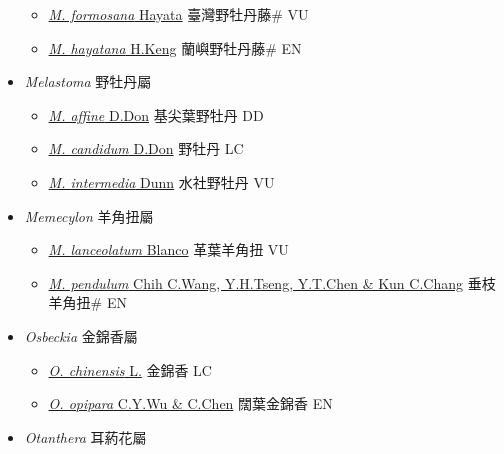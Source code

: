 \begin{itemize}
  \begin{itemize}
        \item[] \href{http://www.theplantlist.org/tpl1.1/search?q=Medinilla+formosana}{\textit{M. formosana} Hayata}   臺灣野牡丹藤\# VU
        \item[] \href{http://www.theplantlist.org/tpl1.1/search?q=Medinilla+hayatana}{\textit{M. hayatana} H.Keng}   蘭嶼野牡丹藤\# EN
  \end{itemize}
 \item[] \textit{Melastoma} 野牡丹屬
                    
  \begin{itemize}
        \item[] \href{http://www.theplantlist.org/tpl1.1/search?q=Melastoma+affine}{\textit{M. affine} D.Don}   基尖葉野牡丹 DD
        \item[] \href{http://www.theplantlist.org/tpl1.1/search?q=Melastoma+candidum}{\textit{M. candidum} D.Don}   野牡丹 LC
        \item[] \href{http://www.theplantlist.org/tpl1.1/search?q=Melastoma+intermedia}{\textit{M. intermedia} Dunn}   水社野牡丹 VU
  \end{itemize}
 \item[] \textit{Memecylon} 羊角扭屬
                    
  \begin{itemize}
        \item[] \href{http://www.theplantlist.org/tpl1.1/search?q=Memecylon+lanceolatum}{\textit{M. lanceolatum} Blanco}   革葉羊角扭 VU
        \item[] \href{http://www.theplantlist.org/tpl1.1/search?q=Memecylon+pendulum}{\textit{M. pendulum} Chih C.Wang, Y.H.Tseng, Y.T.Chen \& Kun C.Chang}   垂枝羊角扭\# EN
  \end{itemize}
 \item[] \textit{Osbeckia} 金錦香屬
                    
  \begin{itemize}
        \item[] \href{http://www.theplantlist.org/tpl1.1/search?q=Osbeckia+chinensis}{\textit{O. chinensis} L.}   金錦香 LC
        \item[] \href{http://www.theplantlist.org/tpl1.1/search?q=Osbeckia+opipara}{\textit{O. opipara} C.Y.Wu \& C.Chen}   闊葉金錦香 EN
  \end{itemize}
 \item[] \textit{Otanthera} 耳葯花屬
                    

\end{itemize}
